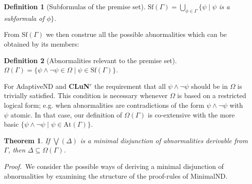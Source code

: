 \documentclass[]{article}
\newtheorem{definition}{Definition}
\newtheorem{theorem}{Theorem}
\newcommand{\Turn}[2]
    { {#1}\vdash_{\textbf{\sf s}}  {#2}}
\newcommand{\TurnPrime}[2]
    { {#1}\vdash_{\textbf{\sf s'}}  {#2}}
\newcommand{\Sf}{\ensuremath{\mathrm{Sf}}}
\newcommand{\At}{\ensuremath{\mathrm{At}}}
\begin{document}


\begin{definition}[Subformulas of the premise set]
$\Sf(\Gamma)=\bigcup_{\phi \in \Gamma} \{\psi \mid \psi$ is a subformula of $ \phi\}$.
\end{definition}


From $\Sf(\Gamma)$ we then construe all the possible abnormalities which can be obtained by its members:

\begin{definition}[Abnormalities relevant to the premise set]
$\Omega(\Gamma)=\{\psi\wedge \neg \psi \in \Omega \mid \psi\in \Sf(\Gamma)\}$.
\end{definition}
For \textsf{AdaptiveND} and \textbf{CLuN$^r$} the requirement that all $\psi\wedge \neg \psi$ should be in $\Omega$ is trivially satisfied. This condition is necessary whenever $\Omega$ is based on a restricted logical form; e.g. when abnormalities are contradictions of the form $\psi \wedge \neg \psi$ with $\psi$ atomic. In that case, our definition of $\Omega(\Gamma)$ is co-extensive with the more basic $\{\psi \wedge \neg \psi \mid \psi \in \At(\Gamma)\}$. 
%
%
\begin{theorem}\label{thm:subform}
    If $\bigvee(\Delta)$ is a minimal disjunction of abnormalities derivable from $\Gamma$, then $\Delta \subseteq \Omega(\Gamma)$.
\end{theorem}
\noindent\textsl{Proof.}~We consider the possible ways of deriving a minimal disjunction of abnormalities by examining the structure of the proof-rules of \textsf{MinimalND}.
\end{document}

